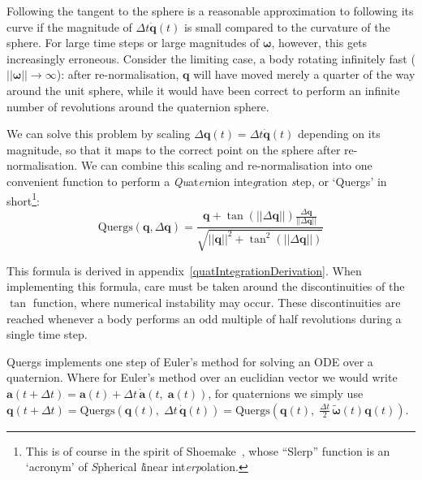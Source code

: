 Following the tangent to the sphere is a reasonable approximation to following its curve if the
magnitude of $\Delta t \dot{\mathbf{q}}(t)$ is small compared to the curvature of the sphere.
For large time steps or large magnitudes of $\bm{\omega}$, however, this gets increasingly
erroneous. Consider the limiting case, a body rotating infinitely fast
($||\bm{\omega}|| \rightarrow \infty$): after re-normalisation, $\mathbf{q}$ will have moved merely
a quarter of the way around the unit sphere, while it would have been correct to perform an
infinite number of revolutions around the quaternion sphere.

We can solve this problem by scaling $\Delta\mathbf{q}(t) = \Delta t \dot{\mathbf{q}}(t)$
depending on its magnitude, so that it maps to the correct point on the sphere after
re-normalisation. We can combine this scaling and re-normalisation into one convenient
function to perform a {\em Qu}at{\em er}nion inte{\em g}ration {\em s}tep, or `Quergs'
in short\footnote{This is of course in the spirit of Shoemake~\cite{Shoemake:85}, whose
``Slerp'' function is an `acronym' of {\em S}pherical {\em l}inear int{\em erp}olation.}:
\begin{equation}
\label{quergs}
\mathrm{Quergs}(\mathbf{q}, \Delta\mathbf{q}) =
    \frac{\mathbf{q} + \tan\left(||\Delta\mathbf{q}||\right)
        \frac{\Delta\mathbf{q}}{||\Delta\mathbf{q}||}}{
    \sqrt{||\mathbf{q}||^2 + \tan^2\left(||\Delta\mathbf{q}||\right)}}
\end{equation}

This formula is derived in appendix~\ref{quatIntegrationDerivation}.
When implementing this formula, care must be taken around the
discontinuities of the $\tan$ function, where numerical instability may occur. These
discontinuities are reached whenever a body performs an odd multiple of half
revolutions during a single time step.

Quergs implements one step of Euler's method for solving an ODE over a quaternion.
Where for Euler's method over an euclidian vector we would write
$\mathbf{a}(t + \Delta t) = \mathbf{a}(t) + \Delta t\,\dot{\mathbf{a}}(t,\;\mathbf{a}(t))$,
for quaternions we simply use
$\mathbf{q}(t + \Delta t) = \mathrm{Quergs}(\mathbf{q}(t),\; \Delta t\,\dot{\mathbf{q}}(t)) =
    \mathrm{Quergs}(\mathbf{q}(t),\; \frac{\Delta t}{2}\,\tilde{\bm{\omega}}(t)\mathbf{q}(t))$.

